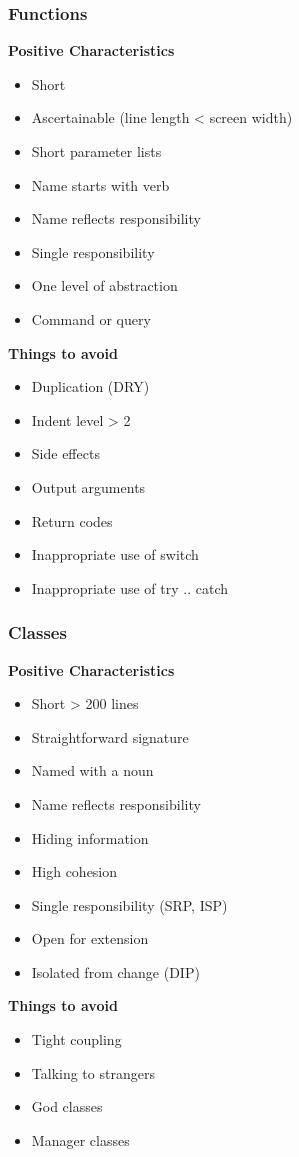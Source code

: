 \subsubsection{Functions}
\textbf{Positive Characteristics}
\begin{itemize}
    \item Short
    \item Ascertainable (line length < screen width)
    \item Short parameter lists
    \item Name starts with verb
    \item Name reflects responsibility
    \item Single responsibility
    \item One level of abstraction
    \item Command or query
\end{itemize}
\textbf{Things to avoid}
\begin{itemize}
    \item Duplication (DRY)
    \item Indent level > 2
    \item Side effects
    \item Output arguments
    \item Return codes
    \item Inappropriate use of switch
    \item Inappropriate use of try .. catch
\end{itemize}

\subsubsection{Classes}
\textbf{Positive Characteristics}
\begin{itemize}
    \item Short > 200 lines
    \item Straightforward signature
    \item Named with a noun
    \item Name reflects responsibility
    \item Hiding information
    \item High cohesion
    \item Single responsibility (SRP, ISP)
    \item Open for extension
    \item Isolated from change (DIP)
\end{itemize}
\textbf{Things to avoid}
\begin{itemize}
    \item Tight coupling
    \item Talking to strangers
    \item God classes
    \item Manager classes
\end{itemize}

